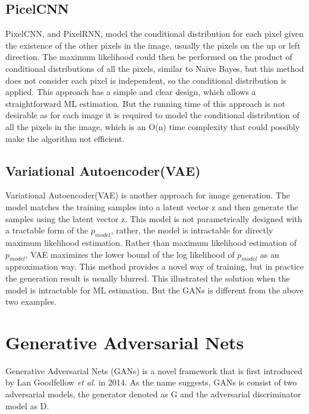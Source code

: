 \documentclass[10pt,twocolumn,letterpaper]{article}
\begin{document}
\subsection{PicelCNN}

PixelCNN, and PixelRNN\cite{van2016conditional}\cite{oord2016pixel}, model the conditional distribution for each pixel given the existence of the other pixels in the image, usually the pixels on the up or left direction. The maximum likelihood could then be performed on the product of conditional distributions of all the pixels, similar to Naive Bayes\cite{rish2001empirical}, but this method does not consider each pixel is independent, so the conditional distribution is applied. This approach has a simple and clear design, which allows a straightforward ML estimation. But the running time of this approach is not desirable as for each image it is required to model the conditional distribution of all the pixels in the image, which is an O(n) time complexity that could possibly make the algorithm not efficient.


\subsection{Variational Autoencoder(VAE)}

Variational Autoencoder(VAE)\cite{kingma2013auto} is another approach for image generation. The model matches the training samples into a latent vector z and then generate the samples using the latent vector z. This model is not parametrically designed with a tractable form of the $p_{model}$, rather, the model is intractable for directly maximum likelihood estimation. Rather than maximum likelihood estimation of $p_{model}$, VAE maximizes the lower bound of the log likelihood of $p_{model}$ as an approximation way. This method provides a novel way of training, but in practice the generation result is usually blurred. This illustrated the solution when the model is intractable for ML estimation. But the GANs is different from the above two examples.


\section{Generative Adversarial Nets}
Generative Adversarial Nets (GANs) is a novel framework that is first introduced by Lan Goodfellow \textit{et al.} in 2014. As the name suggests, GANs is consist of two adversarial models, the generator denoted as G and the adversarial discriminator model as D.\\
\end{document}
